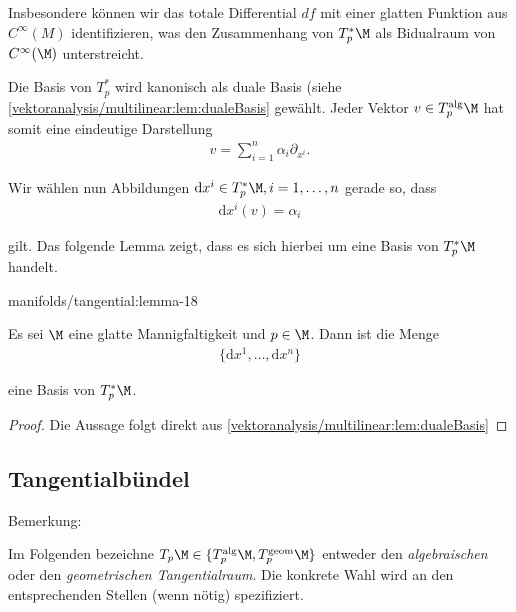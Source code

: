 \documentclass[letterpaper,10pt,german]{jupyterBook}
\begin{document}
\par
Insbesondere können wir das totale Differential \(df\) mit einer glatten Funktion aus \(C^\infty(M)\) identifizieren, was den Zusammenhang von \(T^\ast_p \M\) als Bidualraum von \(C^\infty(\M)\) unterstreicht.

\par
Die Basis von \(T^\ast_p\) wird kanonisch als duale Basis (siehe \cref{vektoranalysis/multilinear:lem:dualeBasis}  gewählt.
Jeder Vektor \(v\in T_p^{\text{alg}}\M\) hat somit eine eindeutige Darstellung
\begin{align*}
v = \sum_{i=1}^n \alpha_i \partial_{x^i}.
\end{align*}
\par
Wir wählen nun Abbildungen \(\mathrm{d}x^i\in T^\ast_p\M, i=1,\ldots,n\) gerade so, dass
\begin{align*}
\mathrm{d}x^i(v) = \alpha_i
\end{align*}
\par
gilt.
Das folgende Lemma zeigt, dass es sich hierbei um eine Basis von \(T^\ast_p\M\) handelt.
\begin{lemma}{}{manifolds/tangential:lemma-18}



\par
Es sei \(\M\) eine glatte Mannigfaltigkeit und \(p\in\M\).
Dann ist die Menge
\begin{align*}
\{\mathrm{d}x^1,\ldots, \mathrm{d}x^n\}
\end{align*}
\par
eine Basis von \(T_p^\ast\M\).
\end{lemma}

\begin{proof}
 Die Aussage folgt direkt aus \cref{vektoranalysis/multilinear:lem:dualeBasis} 
\end{proof}


\subsection{Tangentialbündel}
\label{\detokenize{manifolds/tangential:tangentialbundel}}
\begin{emphBox}{}{}{Bemerkung:}
\par
Im Folgenden bezeichne \(T_p\M\in\{T^{\text{alg}}_p\M, T^{\text{geom}}_p\M \}\) entweder den \emph{algebraischen} oder den \emph{geometrischen Tangentialraum}.
Die konkrete Wahl wird an den entsprechenden Stellen (wenn nötig) spezifiziert.
\end{emphBox}
\end{document}
